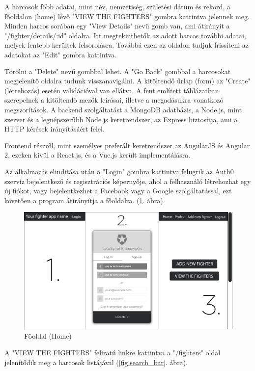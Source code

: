 A harcosok főbb adatai, mint név, nemzetiség, születési dátum és rekord, a főoldalon (home) lévő "VIEW THE FIGHTERS" gombra kattintva jelennek meg. Minden harcos sorában egy "View Details" nevű gomb van, ami átirányít a "/fighter/details/:id" oldalra. Itt megtekinthetők az adott harcos további adatai, melyek fentebb kerültek felsorolásra. Továbbá ezen az oldalon tudjuk frissíteni az adatokat az "Edit" gombra kattintva.

Törölni a "Delete" nevű gombbal lehet. A "Go Back" gombbal a harcosokat megjelenítő oldalra tudunk visszanavigálni. A kitöltendő űrlap (form) az "Create" (létrehozás) esetén validációval van ellátva. A fent említett táblázatban szerepelnek a kitöltendő mezők leírásai, illetve a megadásukra vonatkozó megszorítások. A backend szolgáltatást a MongoDB adatbázis, a Node.js, mint szerver és a legnépszerűbb Node.js keretrendszer, az Express biztosítja, ami a HTTP kérések irányításáért felel.

Frontend részről, mint személyes preferált keretrendszer az AngularJS és Angular 2, ezeken kívül a React.js, és a Vue.js került implementálásra.

Az alkalmazás elindítása után a "Login" gombra kattintva felugrik az Auth0 szervíz bejelentkező és regisztrációs képernyője, ahol a felhasználó létrehozhat egy új fiókot, vagy bejelentkezhet a Facebook vagy a Google szolgáltatással, ezt követően a program átirányítja a főoldalra. (\ref{fig:home}. ábra).

\begin{figure}[htb]
\centering
\includegraphics[scale=0.7]{kepek/login_auth0_home.jpg}
\caption{Főoldal (Home)}
\label{fig:home}
\end{figure}

A "VIEW THE FIGHTERS" feliratú linkre kattintva a "/fighters" oldal jelenítődik meg a harcosok listájával (\ref{fig:search_bar}. ábra).


